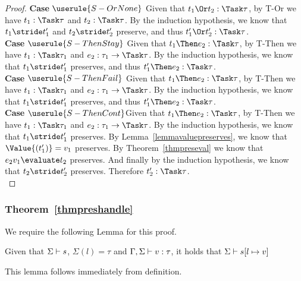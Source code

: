 \begin{proof}
  \noindent\textbf{Case} $\userule{S-OrNone}$ Given that $t_1\Or t_2:\Task\tau$,
  by T-Or we have $t_1:\Task\tau$ and $t_2:\Task\tau$. By the induction hypothesis,
  we know that $t_1\stride t_1'$ and $t_2\stride t_2'$ preserve, and thus
  $t_1'\Or t_2':\Task\tau$.\\

  \noindent\textbf{Case} $\userule{S-ThenStay}$ Given that $t_1\Then e_2:\Task\tau$,
  by T-Then we have $t_1:\Task\tau_1$ and $e_2:\tau_1\to\Task\tau$. By the induction
  hypothesis, we know that $t_1\stride t_1'$ preserves, and thus $t_1'\Then e_2:\Task\tau$.\\

  \noindent\textbf{Case} $\userule{S-ThenFail}$ Given that $t_1\Then e_2:\Task\tau$,
  by T-Then we have $t_1:\Task\tau_1$ and $e_2:\tau_1\to\Task\tau$. By the induction
  hypothesis, we know that $t_1\stride t_1'$ preserves, and thus $t_1'\Then e_2:\Task\tau$.\\

  \noindent\textbf{Case} $\userule{S-ThenCont}$Given that $t_1\Then e_2:\Task\tau$,
  by T-Then we have $t_1:\Task\tau_1$ and $e_2:\tau_1\to\Task\tau$. By the induction
  hypothesis, we know that $t_1\stride t_1'$ preserves. By
  Lemma~\ref{lemmavaluepreserves}, we know that $\Value{(t_1')}=v_1$ preserves.
  By Theorem~\ref{thmpreseval} we know that $e_2 v_1\evaluate t_2$ preserves. And
  finally by the induction hypothesis, we know that $t_2\stride t_2'$ preserves.
  Therefore $t_2':\Task\tau$.\\

\end{proof}


\subsubsection{Theorem~\ref{thmpreshandle}}

We require the following Lemma for this proof.

\begin{lemma}
  Given that $\Sigma\vdash s$, $\Sigma(l)=\tau$ and $\Gamma,\Sigma\vdash v:\tau$, it holds that $\Sigma\vdash s[l\mapsto v]$
  \label{lemmasigmaconsistent}
\end{lemma}
This lemma follows immediately from definition.

